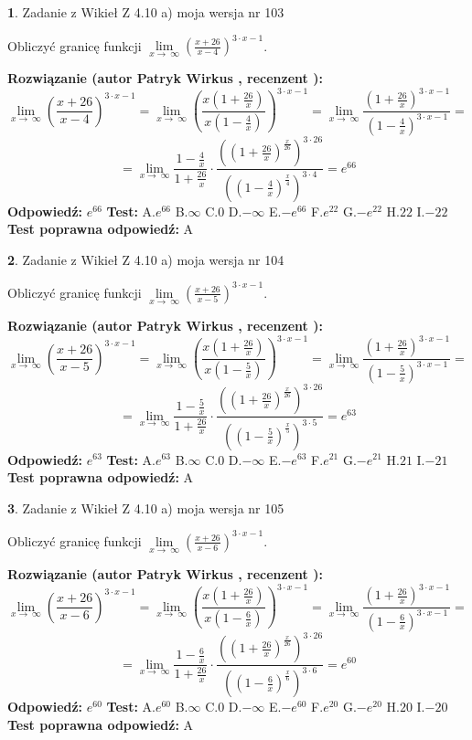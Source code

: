 \documentclass[12pt, a4paper]{article}
\theoremstyle{definition} %
\newtheorem{zad}{}
\newcommand{\zadStart}[1]{\begin{zad}#1\newline}
\newcommand{\zadStop}{\end{zad}}
\newcommand{\rozwStart}[2]{\noindent \textbf{Rozwiązanie (autor #1 , recenzent #2): }\newline}
\newcommand{\rozwStop}{\newline}
\newcommand{\odpStart}{\noindent \textbf{Odpowiedź:}\newline}
\newcommand{\odpStop}{\newline}
\newcommand{\testStart}{\noindent \textbf{Test:}\newline}
\newcommand{\testStop}{\newline}
\newcommand{\kluczStart}{\noindent \textbf{Test poprawna odpowiedź:}\newline}
\newcommand{\kluczStop}{\newline}
\begin{document}
\zadStart{Zadanie z Wikieł Z 4.10 a) moja wersja nr 103}

Obliczyć granicę funkcji  $\lim\limits_{x\to\ \infty}(\frac{x+26}{x-4})^{3\cdot x-1}$.
\zadStop
\rozwStart{Patryk Wirkus}{}
$$\lim\limits_{x\to\ \infty}(\frac{x+26}{x-4})^{3\cdot x-1} = \lim\limits_{x\to\ \infty}(\frac{x(1+\frac{26}{x})}{x(1-\frac{4}{x})})^{3\cdot x-1}=\lim\limits_{x\to\ \infty}\frac{(1+\frac{26}{x})^{3\cdot x-1}}{(1-\frac{4}{x})^{3\cdot x-1}}=$$
$$=\lim\limits_{x\to\ \infty}\frac{1-\frac{4}{x}}{1+\frac{26}{x}}\cdot\frac{((1+\frac{26}{x})^{\frac{x}{26}})^{3\cdot26}}{((1-\frac{4}{x})^{\frac{x}{4}})^{3\cdot4}}=e^{66}$$
\rozwStop
\odpStart
$e^{66}$
\odpStop
\testStart
A.$e^{66}$ B.$\infty$ C.$0$ D.$-\infty$ E.$-e^{66}$
F.$e^{22}$ G.$-e^{22}$
H.$22$
I.$-22$
\testStop
\kluczStart
A
\kluczStop



\zadStart{Zadanie z Wikieł Z 4.10 a) moja wersja nr 104}

Obliczyć granicę funkcji  $\lim\limits_{x\to\ \infty}(\frac{x+26}{x-5})^{3\cdot x-1}$.
\zadStop
\rozwStart{Patryk Wirkus}{}
$$\lim\limits_{x\to\ \infty}(\frac{x+26}{x-5})^{3\cdot x-1} = \lim\limits_{x\to\ \infty}(\frac{x(1+\frac{26}{x})}{x(1-\frac{5}{x})})^{3\cdot x-1}=\lim\limits_{x\to\ \infty}\frac{(1+\frac{26}{x})^{3\cdot x-1}}{(1-\frac{5}{x})^{3\cdot x-1}}=$$
$$=\lim\limits_{x\to\ \infty}\frac{1-\frac{5}{x}}{1+\frac{26}{x}}\cdot\frac{((1+\frac{26}{x})^{\frac{x}{26}})^{3\cdot26}}{((1-\frac{5}{x})^{\frac{x}{5}})^{3\cdot5}}=e^{63}$$
\rozwStop
\odpStart
$e^{63}$
\odpStop
\testStart
A.$e^{63}$ B.$\infty$ C.$0$ D.$-\infty$ E.$-e^{63}$
F.$e^{21}$ G.$-e^{21}$
H.$21$
I.$-21$
\testStop
\kluczStart
A
\kluczStop



\zadStart{Zadanie z Wikieł Z 4.10 a) moja wersja nr 105}

Obliczyć granicę funkcji  $\lim\limits_{x\to\ \infty}(\frac{x+26}{x-6})^{3\cdot x-1}$.
\zadStop
\rozwStart{Patryk Wirkus}{}
$$\lim\limits_{x\to\ \infty}(\frac{x+26}{x-6})^{3\cdot x-1} = \lim\limits_{x\to\ \infty}(\frac{x(1+\frac{26}{x})}{x(1-\frac{6}{x})})^{3\cdot x-1}=\lim\limits_{x\to\ \infty}\frac{(1+\frac{26}{x})^{3\cdot x-1}}{(1-\frac{6}{x})^{3\cdot x-1}}=$$
$$=\lim\limits_{x\to\ \infty}\frac{1-\frac{6}{x}}{1+\frac{26}{x}}\cdot\frac{((1+\frac{26}{x})^{\frac{x}{26}})^{3\cdot26}}{((1-\frac{6}{x})^{\frac{x}{6}})^{3\cdot6}}=e^{60}$$
\rozwStop
\odpStart
$e^{60}$
\odpStop
\testStart
A.$e^{60}$ B.$\infty$ C.$0$ D.$-\infty$ E.$-e^{60}$
F.$e^{20}$ G.$-e^{20}$
H.$20$
I.$-20$
\testStop
\kluczStart
A
\kluczStop
\end{document}
